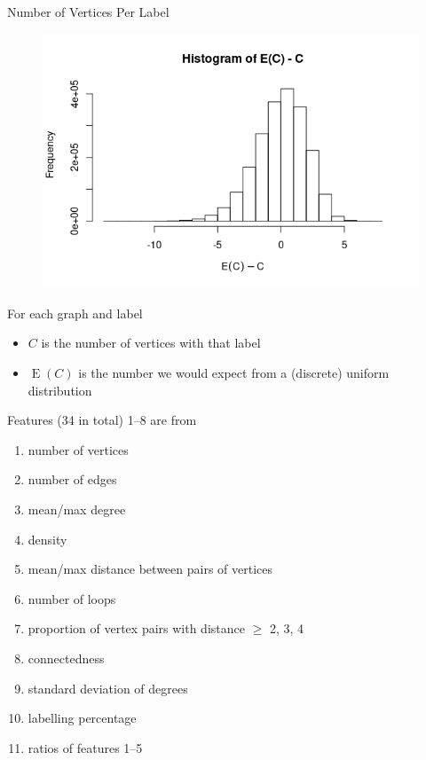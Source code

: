 \documentclass{beamer}
\DeclareMathOperator{\E}{E}
\begin{document}
\begin{frame}{Number of Vertices Per Label}
  \begin{figure}
    \centering
    \includegraphics[scale=0.4]{../dissertation/images/labelling_histogram.png}
  \end{figure}
  For each graph and label
  \begin{itemize}
  \item $C$ is the number of vertices with that label
  \item $\E(C)$ is the number we would expect from a (discrete) uniform distribution
  \end{itemize}
\end{frame}

\begin{frame}{Features (34 in total)}
  1--8 are from \cite{DBLP:conf/lion/KotthoffMS16}
  \begin{enumerate}
  \item number of vertices
  \item number of edges
  \item mean/max degree
  \item density
  \item mean/max distance between pairs of vertices
  \item number of loops
  \item proportion of vertex pairs with distance $\ge$ 2, 3, 4
  \item connectedness
    \pause
  \item standard deviation of degrees
  \item labelling percentage
    \pause
  \item ratios of features 1--5
  \end{enumerate}
\end{frame}
\end{document}
